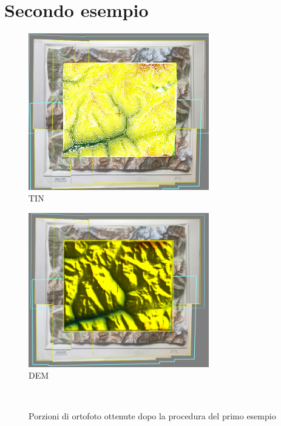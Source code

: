 \section{Secondo esempio} 
\begin{figure}[htb]
\centering
\includegraphics[width=0.7\textwidth]{Img/TIN.png}
\caption{TIN}
\end{figure}
\begin{figure}[htb]
\centering
\includegraphics[width=0.7\textwidth]{Img/DEM.png}
\caption{DEM}
\end{figure}
\begin{figure}[htb]
\centering
{}
\\
%
\caption{Porzioni di ortofoto ottenute dopo la procedura del primo esempio}
\label{fig:Orto2}
\end{figure} 